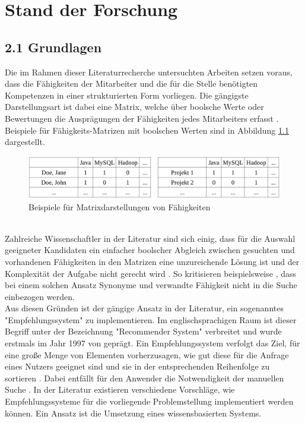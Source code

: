 \chapter{Stand der Forschung}
\label{ch:standDerForschung}
\section[Grundlagen]{2.1 Grundlagen}
\label{ch:standDerForschung:grundlagen}
Die im Rahmen dieser Literaturrecherche untersuchten Arbeiten setzen voraus, dass die Fähigkeiten der Mitarbeiter und die für die Stelle benötigten Kompetenzen in einer strukturierten Form vorliegen. Die gängigste Darstellungsart ist dabei eine Matrix, welche über boolsche Werte oder Bewertungen die Ausprägungen der Fähigkeiten jedes Mitarbeiters erfasst \cite[S. 11f.]{recommenderSystems:2016}. Beispiele für Fähigkeits-Matrizen mit boolschen Werten sind in Abbildung \ref{fig:standDerForschung:abb1} dargestellt.\\
\begin{figure}[h]
	\centering
	\includegraphics[width=1\textwidth]{gfx/Projektmatrix.png}
	\caption{Beispiele für Matrixdarstellungen von Fähigkeiten}
	\label{fig:standDerForschung:abb1}
\end{figure}
\\
Zahlreiche Wissenschaftler in der Literatur sind sich einig, dass für die Auswahl geeigneter Kandidaten ein einfacher boolscher Abgleich zwischen gesuchten und vorhandenen Fähigkeiten in den Matrizen eine unzureichende Lösung ist \cite[S. 1]{enhancingERecruitment:2012}\cite[S. 1]{faerber:2003}\cite[S. 2]{prospect:2010} und der Komplexität der Aufgabe nicht gerecht wird \cite[S. 1]{malinowski:2008}. So kritisieren beispielsweise \textcite[S. 1f.]{mitre:2014}, dass bei einem solchen Ansatz Synonyme und verwandte Fähigkeit nicht in die Suche einbezogen werden.\\
Aus diesen Gründen ist der gängige Ansatz in der Literatur, ein sogenanntes "Empfehlungssystem" zu implementieren. Im englischsprachigen Raum ist dieser Begriff unter der Bezeichnung "Recommender System" verbreitet und wurde erstmals im Jahr 1997 von \textcite{resnick:1997} geprägt. Ein Empfehlungssystem verfolgt das Ziel, für eine große Menge von Elementen vorherzusagen, wie gut diese für die Anfrage eines Nutzers geeignet sind und sie in der entsprechenden Reihenfolge zu sortieren \cite[S. 3]{recommenderSystems:2016}. Dabei entfällt für den Anwender die Notwendigkeit der manuellen Suche \cite[S. 1]{comibingCareer:2013}. In der Literatur existieren verschiedene Vorschläge, wie Empfehlungssysteme für die vorliegende Problemstellung implementiert werden können. Ein Ansatz ist die Umsetzung eines wissensbasierten Systems.
\newpage
